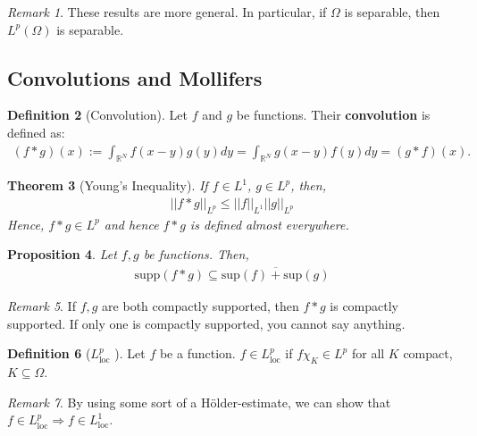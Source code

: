 \documentclass[psamsfonts]{amsart}
\newtheorem{thm}{Theorem}[section]
\newtheorem{prop}[thm]{Proposition}
\theoremstyle{definition}
\newtheorem{defn}[thm]{Definition}
\theoremstyle{remark}
\newtheorem{rem}[thm]{Remark}
\newcommand{\R}[0]{\mathbb{R}}
\numberwithin{equation}{section}
\begin{document}
\begin{rem}
These results are more general. In particular, if \( \Omega \) is separable, then \(L^p(\Omega) \) is separable. 	
\end{rem}


\subsection{Convolutions and Mollifers}

\begin{defn}[Convolution]
	Let \(f \) and \( g \) be functions. Their \textbf{convolution} is defined as: 
	\begin{align*}
		(f * g)(x) := \int_{\R^N} f(x-y)g(y) dy = \int_{\R^N} g(x-y)f(y) dy = (g*f)(x).
	\end{align*}
\end{defn}

\begin{thm}[Young's Inequality]
		If \( f \in L^1 \), \( g \in L^p \), then, 
		\begin{align*}
			\boxed{||f *g||_{L^p} \leq ||f||_{L^1} ||g||_{L^p}}
		\end{align*}
		Hence, \( f*g \in L^p \) and hence \( f *g \) is defined almost everywhere.
\end{thm}

\begin{prop}
	Let \( f, g \) be functions. Then, 
	\begin{align*}
		\text{supp}(f*g) \subseteq \overline{ \text{sup}(f) + \text{sup}(g) }
	\end{align*}
\end{prop}

\begin{rem}
	If \( f, g \) are both compactly supported, then \( f * g \) is compactly supported. If only one is compactly supported, you cannot say anything.	
\end{rem}

\begin{defn}[\(L^p_{\text{loc}} \) ]
	Let \( f \) be a function. \( f \in L^p_{\text{loc}} \) if \( f \chi_{K} \in L^p \) for all \(K \) compact, \(K \subseteq \Omega \).
\end{defn}

\begin{rem}
	By using some sort of a Hölder-estimate, we can show that \( f \in L^p_{\text{loc}} \Rightarrow f \in L^1_{\text{loc}}\).
\end{rem}
\end{document}

